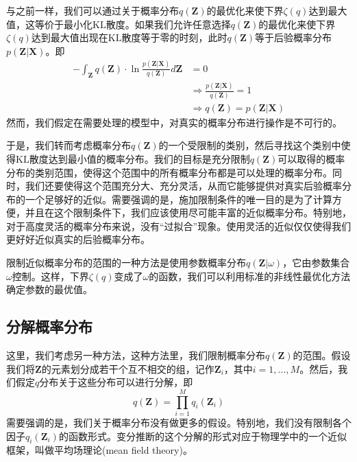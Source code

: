 与之前一样，我们可以通过关于概率分布$q(\boldsymbol{Z})$的最优化来使下界$\zeta(q)$达到最大值，这等价于最小化$\mathrm{KL}$散度。如果我们允许任意选择$q(\boldsymbol{Z})$的最优化来使下界$\zeta(q)$达到最大值出现在$\mathrm{KL}$散度等于零的时刻，此时$q(\boldsymbol{Z})$等于后验概率分布$p(\boldsymbol{Z}|\boldsymbol{X})$。即
\begin{equation}
	\begin{aligned}
		-\int_{\boldsymbol{Z}}q(\boldsymbol{Z} )\cdot\ln \frac{p(\boldsymbol{Z}|\boldsymbol{X})}{q(\boldsymbol{Z})}d\boldsymbol{Z}&=0\\
		&\Rightarrow \frac{p(\boldsymbol{Z}|\boldsymbol{X})}{q(\boldsymbol{Z})}=1\\
		&\Rightarrow q(\boldsymbol{Z})=p(\boldsymbol{Z}|\boldsymbol{X})
	\end{aligned}
\end{equation}
然而，我们假定在需要处理的模型中，对真实的概率分布进行操作是不可行的。

于是，我们转而考虑概率分布$q(\boldsymbol{Z})$的一个受限制的类别，然后寻找这个类别中使得$\mathrm{KL}$散度达到最小值的概率分布。我们的目标是充分限制$q(\boldsymbol{Z})$可以取得的概率分布的类别范围，使得这个范围中的所有概率分布都是可以处理的概率分布。同时，我们还要使得这个范围充分大、充分灵活，从而它能够提供对真实后验概率分布的一个足够好的近似。需要强调的是，施加限制条件的唯一目的是为了计算方便，并且在这个限制条件下，我们应该使用尽可能丰富的近似概率分布。特别地，对于高度灵活的概率分布来说，没有“过拟合”现象。使用灵活的近似仅仅使得我们更好好近似真实的后验概率分布。

限制近似概率分布的范围的一种方法是使用参数概率分布$q(\boldsymbol{Z}|\omega)$，它由参数集合$\omega$控制。这样，下界$\zeta(q)$变成了$\omega$的函数，我们可以利用标准的非线性最优化方法确定参数的最优值。

\subsection*{分解概率分布}
这里，我们考虑另一种方法，这种方法里，我们限制概率分布$q(\boldsymbol{Z})$的范围。假设我们将$\boldsymbol{Z}$的元素划分成若干个互不相交的组，记作$\boldsymbol{Z}_i$，其中$i=1,\dots,M$。然后，我们假定$q$分布关于这些分布可以进行分解，即
\begin{equation}
\label{bianfen}
	q(\boldsymbol{Z})=\prod_{i=1}^{M}q_i(\boldsymbol{Z}_i)
\end{equation}
需要强调的是，我们关于概率分布没有做更多的假设。特别地，我们没有限制各个因子$q_i(\boldsymbol{Z}_i)$的函数形式。变分推断的这个分解的形式对应于物理学中的一个近似框架，叫做平均场理论(mean field theory)。

